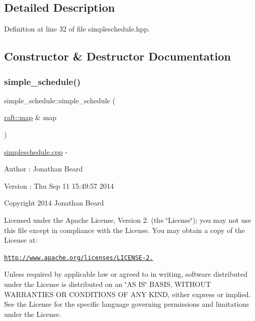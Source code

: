 \subsection{Detailed Description}


Definition at line 32 of file simpleschedule.\+hpp.



\subsection{Constructor \& Destructor Documentation}
\hypertarget{classsimple__schedule_af67989b8a100e97f549e3dee6847a35c}{}\label{classsimple__schedule_af67989b8a100e97f549e3dee6847a35c} 
\subsubsection{\texorpdfstring{simple\+\_\+schedule()}{simple\_schedule()}}
{\footnotesize\ttfamily simple\+\_\+schedule\+::simple\+\_\+schedule (\begin{DoxyParamCaption}\item[{\hyperlink{classraft_1_1map}{raft\+::map} \&}]{map }\end{DoxyParamCaption})}

\hyperlink{simpleschedule_8cpp_source}{simpleschedule.\+cpp} -\/ \begin{DoxyAuthor}{Author}
\+: Jonathan Beard 
\end{DoxyAuthor}
\begin{DoxyVersion}{Version}
\+: Thu Sep 11 15\+:49\+:57 2014
\end{DoxyVersion}
Copyright 2014 Jonathan Beard

Licensed under the Apache License, Version 2. (the \char`\"{}\+License\char`\"{}); you may not use this file except in compliance with the License. You may obtain a copy of the License at\+:

\href{http://www.apache.org/licenses/LICENSE-2.0}{\tt http\+://www.\+apache.\+org/licenses/\+L\+I\+C\+E\+N\+S\+E-\/2.}

Unless required by applicable law or agreed to in writing, software distributed under the License is distributed on an \char`\"{}\+A\+S I\+S\char`\"{} B\+A\+S\+IS, W\+I\+T\+H\+O\+UT W\+A\+R\+R\+A\+N\+T\+I\+ES OR C\+O\+N\+D\+I\+T\+I\+O\+NS OF A\+NY K\+I\+ND, either express or implied. See the License for the specific language governing permissions and limitations under the License. 

